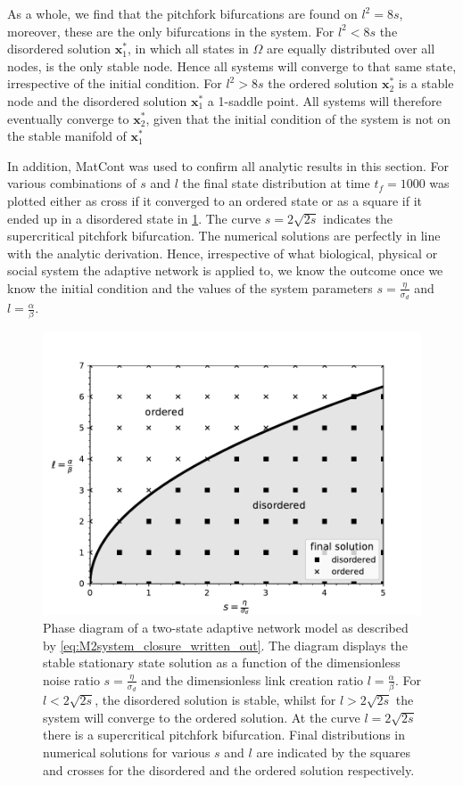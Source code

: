 As a whole, we find that the pitchfork bifurcations are found on $l^2=8s$, moreover, these are the only bifurcations in the system. For $l^2 < 8s$ the disordered solution $\bm{x}_1^*$, in which all states in $\Omega$ are equally distributed over all nodes, is the only stable node. Hence all systems will converge to that same state, irrespective of the initial condition. For $l^2 > 8s$ the ordered solution $\bm{x}_2^*$ is a stable node and the disordered solution $\bm{x}_1^*$ a 1-saddle point. All systems will therefore eventually converge to $\bm{x}_2^*$, given that the initial condition of the system is not on the stable manifold of $\bm{x}_1^*$

In addition, MatCont was used to confirm all analytic results in this section. For various combinations of $s$ and $l$ the final state distribution at time $t_f=1000$ was plotted either as cross if it converged to an ordered state or as a square if it ended up in a disordered state in \cref{fig:phase_diag_M2}. The curve $s=2\sqrt{2s}$ indicates the supercritical pitchfork bifurcation. The numerical solutions are perfectly in line with the analytic derivation. Hence, irrespective of what biological, physical or social system the adaptive network is applied to, we know the outcome once we know the initial condition and the values of the system parameters $s=\frac{\eta}{\sigma_d}$ and $l=\frac{\alpha}{\beta}$. 

\begin{figure}[htp]
	\centering
	\includegraphics[width=0.7\linewidth, trim={0 0 0 1cm},clip=true]{figures/phase_diag_M2_sims}
	\caption{Phase diagram of a two-state adaptive network model as described by \cref{eq:M2system_closure_written_out}. The diagram displays the stable stationary state solution as a function of the dimensionless noise ratio $s=\frac{\eta}{\sigma_d}$ and the dimensionless link creation ratio $l=\frac{\alpha}{\beta}$. For $l<2\sqrt{2s}$, the disordered solution is stable, whilst for $l>2\sqrt{2s}$ the system will converge to the ordered solution. At the curve $l=2\sqrt{2s}$ there is a supercritical pitchfork bifurcation. Final distributions in numerical solutions for various $s$ and $l$ are indicated by the squares and crosses for the disordered and the ordered solution respectively. }
	\label{fig:phase_diag_M2}
\end{figure}

